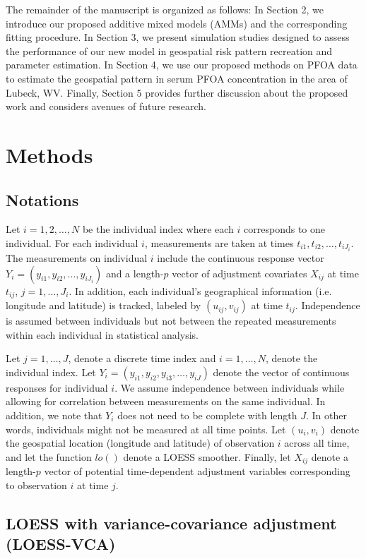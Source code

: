 	The remainder of the manuscript is organized as follows: In Section 2, we introduce our proposed additive mixed models (AMMs) and the corresponding fitting procedure. In Section 3, we present simulation studies designed to assess the performance of our new model in geospatial risk pattern recreation and parameter estimation. In Section 4, we use our proposed methods on PFOA data to estimate the geospatial pattern in serum PFOA concentration in the area of Lubeck, WV. Finally, Section 5 provides further discussion about the proposed work and considers avenues of future research.
	
	\section{Methods}
	\label{s:Methods}
	\subsection{Notations}
	Let $i=1,2,\dots,N$ be the individual index where each $i$ corresponds to one individual. For each individual $i$, measurements are taken at times $t_{i1}, t_{i2},\dots,t_{iJ_i}$. The measurements on individual $i$ include the continuous response vector $Y_i=(y_{i1}, y_{i2}, \dots, y_{iJ_i})$ and a length-$p$ vector of adjustment covariates $X_{ij}$ at time $t_{ij}$, $j=1,\dots,J_i$. In addition, each individual's geographical information (i.e. longitude and latitude) is tracked, labeled by $(u_{ij},v_{ij})$ at time $t_{ij}$. Independence is assumed between individuals but not between the repeated measurements within each individual in statistical analysis.
	
	  Let $j=1,\dots,J$, denote a discrete time index and $i=1,\dots,N$, denote the individual index. Let $Y_i=(y_{i1}, y_{i2}, y_{i3}, \dots, y_{iJ})$ denote the vector of continuous responses for individual $i$.  We assume independence between individuals while allowing for correlation between measurements on the same individual. In addition, we note that $Y_i$ does not need to be complete with length $J$. In other words, individuals might not be measured at all time points. Let $(u_{i},v_{i})$ denote the geospatial location (longitude and latitude) of observation $i$ across all time, and let the function $lo()$ denote a LOESS smoother. Finally, let $X_{ij}$ denote a length-$p$ vector of potential time-dependent adjustment variables corresponding to observation $i$ at time $j$. 
	
	\subsection{LOESS with variance-covariance adjustment (LOESS-VCA)}
	
